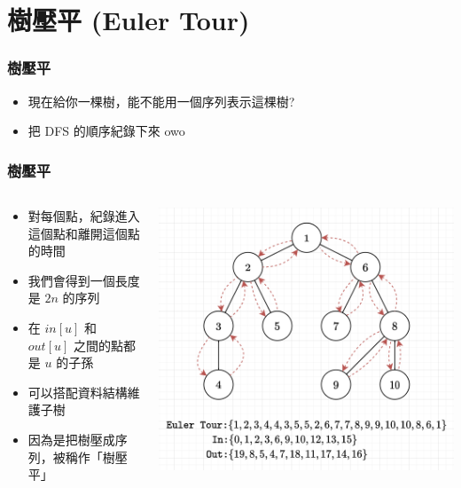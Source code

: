 \documentclass[aspectratio=169]{beamer}
\begin{document}
    \section{樹壓平 (Euler Tour)}
    \begin{frame}
        \frametitle{樹壓平}
        \begin{itemize}
            \item 現在給你一棵樹，能不能用一個序列表示這棵樹?
            \item<2-> 把 DFS 的順序紀錄下來 owo
        \end{itemize}
    \end{frame}
    
    \begin{frame}
        \frametitle{樹壓平}
        \begin{columns}
            \begin{column}{0.6 \textwidth}
                \begin{itemize}
                    \item 對每個點，紀錄進入這個點和離開這個點的時間
                    \item 我們會得到一個長度是 $2n$ 的序列
                    \item<2-> 在 $in[u]$ 和 $out[u]$ 之間的點都是 $u$ 的子孫
                    \item<3-> 可以搭配資料結構維護子樹
                    \item<4-> 因為是把樹壓成序列，被稱作「樹壓平」
                \end{itemize}
            \end{column}
            \begin{column}{0.4 \textwidth}
                \begin{center}
                    \includegraphics[scale=0.3]{images/euler_tour.png}
                \end{center}
            \end{column}
        \end{columns}
    \end{frame}
    
\end{document}
